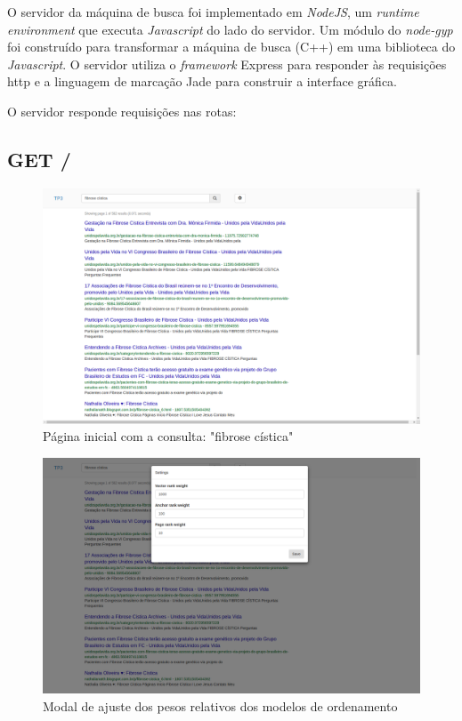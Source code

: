 \documentclass{article}
\begin{document}
O servidor da máquina de busca foi implementado em \textit{NodeJS}, um \textit{runtime environment} 
que executa \textit{Javascript} do lado do servidor. Um módulo do \textit{node-gyp} foi construído
para transformar a máquina de busca (C++) em uma biblioteca do \textit{Javascript}. O servidor
utiliza o \textit{framework} Express para responder às requisições http e a linguagem de marcação 
Jade para construir a interface gráfica. 

O servidor responde requisições nas rotas:

\subsection{GET /}

\begin{figure}
\centering
\includegraphics[width=\linewidth]{page_1.png}
\caption{Página inicial com a consulta: "fibrose cística"} 
\label{fig:page_1}
\end{figure}

\begin{figure}
\centering
\includegraphics[width=\linewidth]{page_1_modal.png}
\caption{Modal de ajuste dos pesos relativos dos modelos de ordenamento} 
\label{fig:page_1_modal}
\end{figure}
\end{document}
